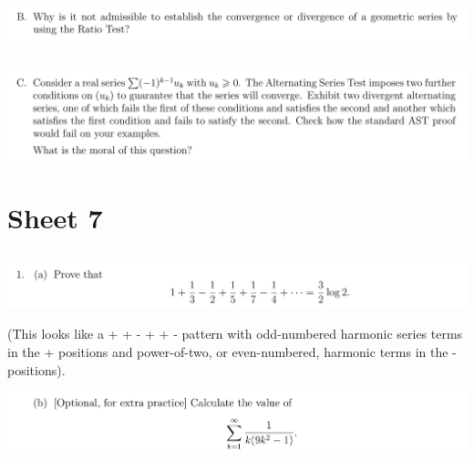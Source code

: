 \documentclass[12pt]{article}
\begin{document}
\newpage
\subsection{}
\begin{mdframed}
\includegraphics[width=400pt]{img/analysis--oxford-M2-I-6-extra-B.png}
\end{mdframed}

\newpage
\subsection{}
\begin{mdframed}
\includegraphics[width=400pt]{img/analysis--oxford-M2-I-6-extra-C.png}
\end{mdframed}




\newpage
\section{Sheet 7}

\subsection{}
\begin{mdframed}
\includegraphics[width=400pt]{img/analysis--oxford-M2-I-7-1-a.png}
\end{mdframed}

(This looks like a + + - + + - pattern with odd-numbered harmonic series terms in the + positions
and power-of-two, or even-numbered, harmonic terms in the - positions).


\begin{mdframed}
\includegraphics[width=400pt]{img/analysis--oxford-M2-I-7-1-b.png}
\end{mdframed}
\end{document}
